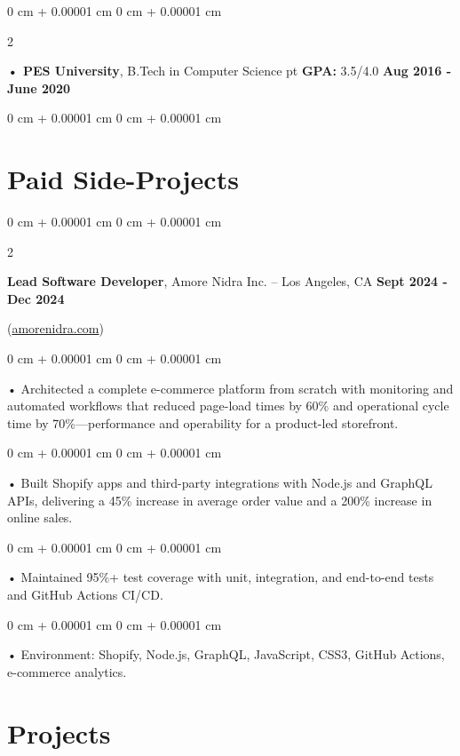 \documentclass[10pt, letterpaper]{article}
\newenvironment{onecolentry}{
    \begin{adjustwidth}{
        0 cm + 0.00001 cm
    }{
        0 cm + 0.00001 cm
    }
}{
    \end{adjustwidth}
} %
\newenvironment{twocolentry}[2][]{
    \onecolentry
    \def\secondColumn{#2}
    \setcolumnwidth{\fill, 4.5 cm}
    \begin{paracol}{2}
}{
    \switchcolumn \raggedleft \secondColumn
    \end{paracol}
    \endonecolentry
} %
\begin{document}
        \begin{twocolentry}{
            \textbf{Aug 2016 - June 2020}
        }
            \textbf{ • PES University}, B.Tech in Computer Science  pt \textbf{GPA:} 3.5/4.0  \end{twocolentry}
        \begin{onecolentry}

                        \vspace{0.4cm}
    \section{Paid Side-Projects}
            \vspace{2 pt }
        \begin{twocolentry}{
            \textbf{Sept 2024 - Dec 2024}
        }
            \textbf{Lead Software Developer}, Amore Nidra Inc. -- Los Angeles, CA\end{twocolentry}(\href{https://amorenidra.com}{amorenidra.com})

        \begin{onecolentry}
             • Architected a complete e-commerce platform from scratch with monitoring and automated workflows that reduced page-load times by 60\% and operational cycle time by 70\%---performance and operability for a product-led storefront.
        \end{onecolentry}
        \begin{onecolentry}
             • Built Shopify apps and third-party integrations with Node.js and GraphQL APIs, delivering a 45\% increase in average order value and a 200\% increase in online sales.
        \end{onecolentry}
        \begin{onecolentry}
             • Maintained 95\%+ test coverage with unit, integration, and end-to-end tests and GitHub Actions CI/CD.
        \end{onecolentry}
        \begin{onecolentry}
             • Environment: Shopify, Node.js, GraphQL, JavaScript, CSS3, GitHub Actions, e-commerce analytics.
        \end{onecolentry}
             \vspace{2 pt }

        \vspace{0.4cm}
\section{Projects}
    \vspace{2 pt}
\end{onecolentry}
\end{document}
